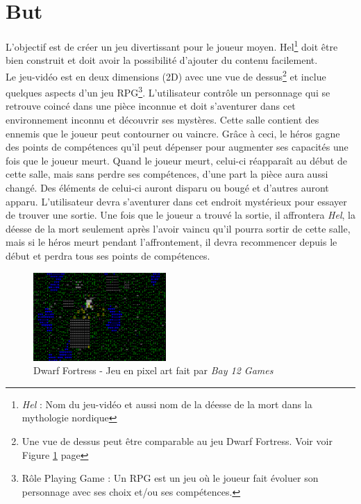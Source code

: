 \documentclass[11pt, a4paper, oneside]{report}
\newcommand{\projectTitle}{Hel}
\begin{document}
\section{But}
L'objectif est de créer un jeu divertissant pour le joueur moyen. \projectTitle\footnote{\textit{\projectTitle} : Nom du jeu-vidéo et aussi nom de la déesse de la mort dans la mythologie nordique} doit être bien construit et doit avoir la possibilité d'ajouter du contenu facilement.\\[.5cm]
Le jeu-vidéo est en deux dimensions (2D) avec une vue de dessus\footnote{Une vue de dessus peut être comparable au jeu Dwarf Fortress. Voir voir Figure \ref{fig:df} page \pageref{fig:df}} et inclue quelques aspects d'un jeu RPG\footnote{Rôle Playing Game : Un RPG est un jeu où le joueur fait évoluer son personnage avec ses choix et/ou ses compétences.}. L'utilisateur contrôle un personnage qui se retrouve coincé dans une pièce inconnue et doit s'aventurer dans cet environnement inconnu et découvrir ses mystères. Cette salle contient des ennemis que le joueur peut contourner ou vaincre. Grâce à ceci, le héros gagne des points de compétences qu'il peut dépenser pour augmenter ses capacités une fois que le joueur meurt. Quand le joueur meurt, celui-ci réapparaît au début de cette salle, mais sans perdre ses compétences, d'une part la pièce aura aussi changé. Des éléments de celui-ci auront disparu ou bougé et d'autres auront apparu. L'utilisateur devra s'aventurer dans cet endroit mystérieux pour essayer de trouver une sortie. Une fois que le joueur a trouvé la sortie, il affrontera \emph{Hel}, la déesse de la mort seulement après l'avoir vaincu qu'il pourra sortir de cette salle, mais si le héros meurt pendant l'affrontement, il devra recommencer depuis le début et perdra tous ses points de compétences.

\begin{figure}[h]
	\begin{center}
	\includegraphics[width=0.45\textwidth]{df}
	\caption{Dwarf Fortress - Jeu en pixel art fait par \textit{Bay 12 Games}}
	\label{fig:df}
	\end{center}
\end{figure}
\end{document}
